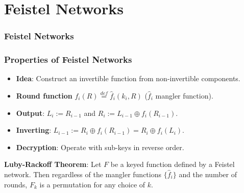 \section{Feistel Networks}
\begin{frame}\frametitle{Feistel Networks}
\begin{figure}
\begin{center}

\end{center}
\end{figure}
\end{frame}
\begin{frame}\frametitle{Properties of Feistel Networks}
\begin{itemize}
\item \textbf{Idea}: Construct an invertible function from non-invertible components.
\item \textbf{Round function} $f_i(R) \overset{def}{=} \hat{f}_i(k_i,R)$ ($\hat{f}_i$ mangler function).
\item \textbf{Output}: $L_i := R_{i-1}$ and $R_i := L_{i-1} \oplus f_i(R_{i-1})$.
\item \textbf{Inverting}: $L_{i-1} := R_i \oplus f_i(R_{i-1}) = R_i \oplus f_i(L_i)$.
\item \textbf{Decryption}: Operate with sub-keys in reverse order.
\end{itemize}
\begin{proposition}
\textbf{Luby-Rackoff Theorem}: Let $F$ be a keyed function defined by a Feistel network. Then regardless of the mangler functions $\{\hat{f}_i\}$ and the number of rounds, $F_k$ is a permutation for any choice of $k$.
\end{proposition}
\end{frame}

